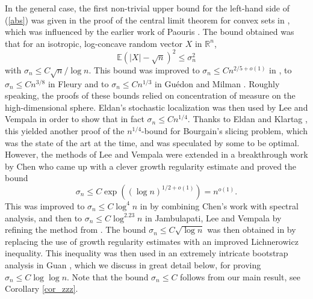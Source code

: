 \documentclass[12pt,a4paper]{article}
\newcommand{\EE}{\mathbb{E}}
\newcommand{\RR}{\mathbb{R}}
\theoremstyle{definition}
\begin{document}
\medskip In the general case, the first non-trivial upper bound for the left-hand
side of (\ref{abs}) was given in the proof of the central limit theorem for convex sets in \cite{K_clt}, which was influenced by the earlier work of Paouris \cite{paouris}.
The bound obtained was that for an isotropic, log-concave random vector $X$ in $\RR^n$,
$$ \EE \left(|X| - \sqrt{n} \right)^2 \leq \sigma_n^2 $$
with $\sigma_n \leq C \sqrt{n} / \log n$. This bound was improved
to $\sigma_n \leq C n^{2/5 + o(1)}$ in \cite{K_poly}, to $\sigma_n \leq C n^{3/8}$ in Fleury \cite{fleury}
and to $\sigma_n \leq C n^{1/3}$ in Gu\'edon and Milman \cite{guedon_milman}. Roughly speaking, the proofs of these bounds
relied on concentration of measure on the high-dimensional sphere.
 Eldan's stochastic localization was then used by Lee and Vempala \cite{LV_focs} in order to show that in fact $\sigma_n \leq C n^{1/4}$.
 Thanks to Eldan and Klartag \cite{EK}, this yielded another proof
 of the $n^{1/4}$-bound for Bourgain's slicing problem, which was the state of the art at the time, and was speculated by some to be optimal. However, the methods of Lee and Vempala were extended  in a breakthrough work by Chen \cite{chen} who came up with a clever growth regularity estimate and proved  the bound
 $$ \sigma_n \leq C \exp \left( ( \log n)^{1/2 + o(1)} \right) = n^{o(1)}. $$
 This was improved to $\sigma_n \leq C \log^4 n$ in \cite{KL} by combining Chen's work with spectral analysis, and then
 to $\sigma_n \leq C \log^{2.23} n$ in Jambulapati, Lee and Vempala
 \cite{JLV} by refining the method from \cite{KL}. The bound $\sigma_n \leq C \sqrt{\log n}$ was then obtained in \cite{K_root} by replacing the use of growth regularity estimates with an improved Lichnerowicz inequality. This inequality was then used in an extremely intricate bootstrap analysis in Guan \cite{guan}, which we discuss in great detail below, for proving $\sigma_n \leq C \log \log n$. Note that the bound $\sigma_n \leq C$ follows from our main result, see Corollary \ref{cor_zzz}. 
 
\end{document}
